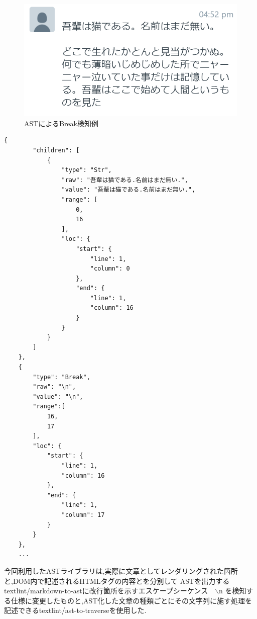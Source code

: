 
\newpage
\begin{figure}[H]
    \centering
    \label{fig:ASTofBreak}
    \includegraphics[width=0.6\columnwidth]{image/03/breakAST.png}
	\caption[ASTによるBreak検知例]{ASTによるBreak検知例}
\end{figure}

\begin{lstlisting}[caption=textToAST.json]
    {
        "children": [
            {
                "type": "Str",
                "raw": "吾輩は猫である.名前はまだ無い.",
                "value": "吾輩は猫である.名前はまだ無い.",
                "range": [
                    0,
                    16
                ],
                "loc": {
                    "start": {
                        "line": 1,
                        "column": 0
                    },
                    "end": {
                        "line": 1,
                        "column": 16
                    }
                }
            }
        ]
    },
    {
        "type": "Break",
        "raw": "\n",
        "value": "\n",
        "range":[
            16,
            17
        ],
        "loc": {
            "start": {
                "line": 1,
                "column": 16
            },
            "end": {
                "line": 1,
                "column": 17
            }
        }
    },
    ...
\end{lstlisting}

今回利用したASTライブラリは,実際に文章としてレンダリングされた箇所と,DOM内で記述されるHTMLタグの内容とを分別して
ASTを出力するtextlint/markdown-to-astに改行箇所を示すエスケープシーケンス　$\backslash$n
を検知する仕様に変更したものと\footnotemark[5],AST化した文章の種類ごとにその文字列に施す処理を記述できるtextlint/ast-to-traverseを使用した.\footnotemark[6]


